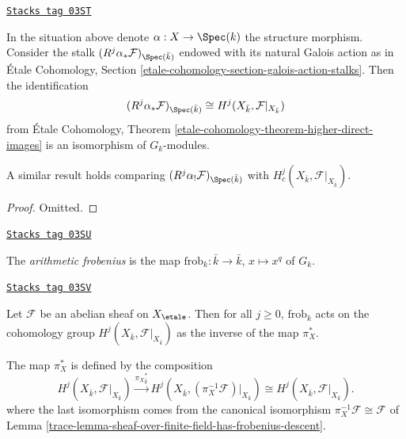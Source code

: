 \begin{lemma}
\label{trace-lemma-two-actions-agree}
\href{https://stacks.math.columbia.edu/tag/03ST}{\texttt{Stacks tag 03ST}}

In the situation above denote $\alpha : X \to \Spec(k)$ the structure morphism.
Consider the stalk $(R^j\alpha_*\mathcal{F})_{\Spec(\bar k)}$ endowed with its
natural Galois action as in
\'Etale Cohomology, Section \ref{etale-cohomology-section-galois-action-stalks}.
Then the identification
$$
(R^j\alpha_*\mathcal{F})_{\Spec(\bar k)} \cong H^j (X_{\bar k},
\mathcal{F}|_{X_{\bar k}})
$$
from
\'Etale Cohomology, Theorem \ref{etale-cohomology-theorem-higher-direct-images}
is an isomorphism of $G_k$-modules.
\end{lemma}

A similar result holds comparing
$(R^j\alpha_!\mathcal{F})_{\Spec(\bar k)}$ with
$H^j_c (X_{\bar k}, \mathcal{F}|_{X_{\bar k}})$.

\begin{proof}
Omitted.
\end{proof}

\begin{definition}
\label{trace-definition-arithmetic-frobenius}
\href{https://stacks.math.columbia.edu/tag/03SU}{\texttt{Stacks tag 03SU}}

The {\it arithmetic frobenius} is the map
$\text{frob}_k : \bar k \to \bar k$, $x \mapsto x^q$ of $G_k$.
\end{definition}

\begin{theorem}
\label{trace-theorem-geometric-arithmetic-inverse}
\href{https://stacks.math.columbia.edu/tag/03SV}{\texttt{Stacks tag 03SV}}

Let $\mathcal{F}$ be an abelian sheaf on $X_\etale$. Then for all
$j\geq 0$, $\text{frob}_k$ acts on the cohomology group $H^j(X_{\bar k},
\mathcal{F}|_{X_{\bar k}})$ as the inverse of the map $\pi_X^*$.
\end{theorem}

The map $\pi_X^*$ is defined by the composition
$$
H^j(X_{\bar k}, \mathcal{F}|_{X_{\bar k}}) \xrightarrow{{\pi_X}_{\bar k}^*}
H^j(X_{\bar k}, (\pi_X^{-1} \mathcal{F})|_{X_{\bar k}}) \cong
H^j(X_{\bar k}, \mathcal{F}|_{X_{\bar k}}).
$$
where the last isomorphism comes from the canonical isomorphism
$\pi_X^{-1} \mathcal{F} \cong \mathcal{F}$ of
Lemma \ref{trace-lemma-sheaf-over-finite-field-has-frobenius-descent}.

